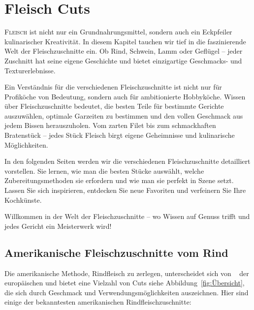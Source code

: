 \chapter{Fleisch Cuts}\label{Chapter9}

\lettrine[lines=3]{F}{leisch} ist nicht nur ein Grundnahrungsmittel, sondern auch ein 
Eckpfeiler kulinarischer Kreativität. In diesem Kapitel tauchen wir tief in die 
faszinierende Welt der Fleischzuschnitte ein. Ob Rind, Schwein, Lamm oder 
Geflügel – jeder Zuschnitt hat seine eigene Geschichte und bietet einzigartige 
Geschmacks- und Texturerlebnisse.

Ein Verständnis für die verschiedenen Fleischzuschnitte ist nicht nur für 
Profiköche von Bedeutung, sondern auch für ambitionierte Hobbyköche. 
Wissen über Fleischzuschnitte bedeutet, die besten Teile für bestimmte 
Gerichte auszuwählen, optimale Garzeiten zu bestimmen und den vollen 
Geschmack aus jedem Bissen herauszuholen. Vom zarten Filet bis zum 
schmackhaften Bratenstück – jedes Stück Fleisch birgt eigene Geheimnisse 
und kulinarische Möglichkeiten.

In den folgenden Seiten werden wir die verschiedenen Fleischzuschnitte 
detailliert vorstellen. Sie lernen, wie man die besten Stücke auswählt, welche 
Zubereitungsmethoden sie erfordern und wie man sie perfekt in Szene setzt. 
Lassen Sie sich inspirieren, entdecken Sie neue Favoriten und verfeinern Sie 
Ihre Kochkünste.

Willkommen in der Welt der Fleischzuschnitte – wo Wissen auf Genuss trifft 
und jedes Gericht ein Meisterwerk wird!

\section{Amerikanische Fleischzuschnitte vom Rind}

Die amerikanische Methode, Rindfleisch zu zerlegen, unterscheidet sich von ~
der europäischen und bietet eine Vielzahl von Cuts siehe 
Abbildung~\vref{fig:Übersicht}, die sich durch Geschmack und 
Verwendungsmöglichkeiten auszeichnen. Hier sind einige der bekanntesten 
amerikanischen Rindfleischzuschnitte:

